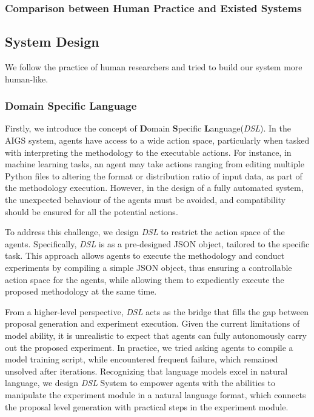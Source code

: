 \documentclass{article} %
\begin{document}
\subsubsection{Comparison between Human Practice and Existed Systems}


\subsection{System Design}

We follow the practice of human researchers and tried to build our system more human-like.

\subsubsection{Domain Specific Language}
\label{sec:dsl}

Firstly, we introduce the concept of \textbf{D}omain \textbf{S}pecific \textbf{L}anguage(\textit{DSL}). In the AIGS system, agents have access to a wide action space, particularly when tasked with interpreting the methodology to the executable actions. For instance, in machine learning tasks, an agent may take actions ranging from editing multiple Python files to altering the format or distribution ratio of input data, as part of the methodology execution. However, in the design of a fully automated system, the unexpected behaviour of the agents must be avoided, and compatibility should be ensured for all the potential actions.

To address this challenge, we design \textit{DSL} to restrict the action space of the agents. Specifically, \textit{DSL} is as a pre-designed JSON object, tailored to the specific task. This approach allows agents to execute the methodology and conduct experiments by compiling a simple JSON object, thus ensuring a controllable action space for the agents, while allowing them to expediently execute the proposed methodology at the same time.

From a higher-level perspective, \textit{DSL} acts as the bridge that fills the gap between proposal generation and experiment execution. Given the current limitations of model ability, it is unrealistic to expect that agents can fully autonomously carry out the proposed experiment. In practice, we tried asking agents to compile a model training script, while encountered frequent failure, which remained unsolved after iterations. Recognizing that language models excel in natural language, we design \textit{DSL} System to empower agents with the abilities to manipulate the experiment module in a natural language format, which connects the proposal level generation with practical steps in the experiment module. 
\end{document}
